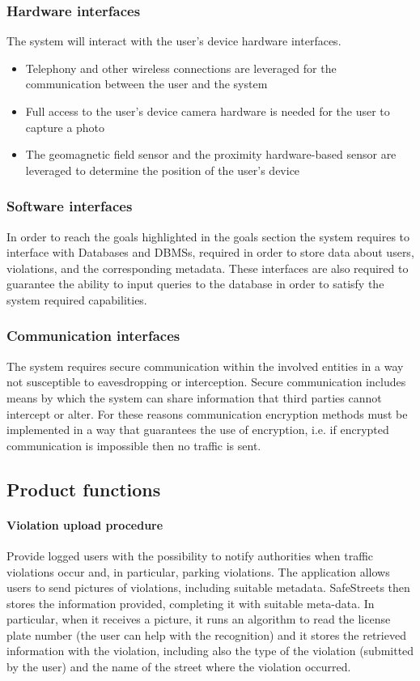 \subsubsection{Hardware interfaces}
	The system will interact with the user's device hardware interfaces.	
	\begin{itemize} 
		\item Telephony and other wireless connections are leveraged for the communication between the user and the system
		\item Full access to the user's device camera hardware is needed for the user to capture a photo
		\item The geomagnetic field sensor and the proximity hardware-based sensor are leveraged to determine the position of the user's device
	\end{itemize}

\subsubsection{Software interfaces}
	In order to reach the goals highlighted in the goals section the system requires to interface with Databases and DBMSs, required in order to store data about users, violations, and the corresponding metadata. These interfaces are also required to guarantee the ability to input queries to the database in order to satisfy the system required capabilities.
	
\subsubsection{Communication interfaces}
	The system requires secure communication within the involved entities in a way not susceptible to eavesdropping or interception. Secure communication includes means by which the system can share information that third parties cannot intercept or alter. For these reasons communication encryption methods must be implemented in a way that guarantees the use of encryption, i.e. if encrypted communication is impossible then no traffic is sent.

\subsection{Product functions}
\paragraph{Violation upload procedure} 
Provide logged users with the possibility to notify authorities when traffic violations occur and, in particular, parking violations. The application allows users to send pictures of violations, including suitable metadata.
SafeStreets then stores the information provided, completing it with suitable meta-­data. In particular, when it receives a picture, it runs an algorithm to read the license plate number (the user can help with the recognition) and it stores the retrieved information with the violation, including also the type of the violation (submitted by the user) and the name of the street where the violation occurred.

